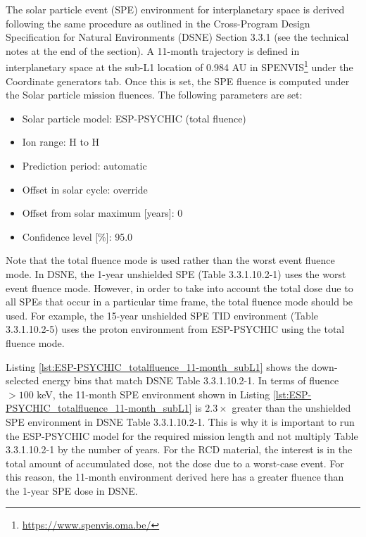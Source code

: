 \documentclass{hitec}
\begin{document}
The solar particle event (SPE) environment for interplanetary space is derived following the same procedure as outlined in the Cross-Program Design Specification for Natural Environments (DSNE) Section 3.3.1 (see the technical notes at the end of the section). A 11-month trajectory is defined in interplanetary space at the sub-L1 location of 0.984 AU in SPENVIS\footnote{\url{https://www.spenvis.oma.be/}} under the \textsf{Coordinate generators} tab. Once this is set, the SPE fluence is computed under the \textsf{Solar particle mission fluences}. The following parameters are set:
\begin{itemize}
	\item Solar particle model: ESP-PSYCHIC (total fluence)
	\item Ion range: H to H
	\item Prediction period: automatic
	\item Offset in solar cycle: override
	\item Offset from solar maximum [years]: 0
	\item Confidence level [\%]: 95.0
\end{itemize}

Note that the \textsf{total fluence} mode is used rather than the \textsf{worst event fluence} mode. In DSNE, the 1-year unshielded SPE (Table 3.3.1.10.2-1) uses the \textsf{worst event fluence} mode. However, in order to take into account the total dose due to all SPEs that occur in a particular time frame, the \textsf{total fluence} mode should be used. For example, the 15-year unshielded SPE TID environment (Table 3.3.1.10.2-5) uses the proton environment from ESP-PSYCHIC using the \textsf{total fluence} mode.

Listing \ref{lst:ESP-PSYCHIC_totalfluence_11-month_subL1} shows the down-selected energy bins that match DSNE Table 3.3.1.10.2-1. In terms of fluence $> 100$ keV, the 11-month SPE environment shown in Listing \ref{lst:ESP-PSYCHIC_totalfluence_11-month_subL1} is $2.3\times$ greater than the unshielded SPE environment in DSNE Table 3.3.1.10.2-1.%
This is why it is important to run the ESP-PSYCHIC model for the required mission length and not multiply Table 3.3.1.10.2-1 by the number of years. For the RCD material, the interest is in the total amount of accumulated dose, not the dose due to a worst-case event. For this reason, the 11-month environment derived here has a greater fluence than the 1-year SPE dose in DSNE.%
\end{document}
